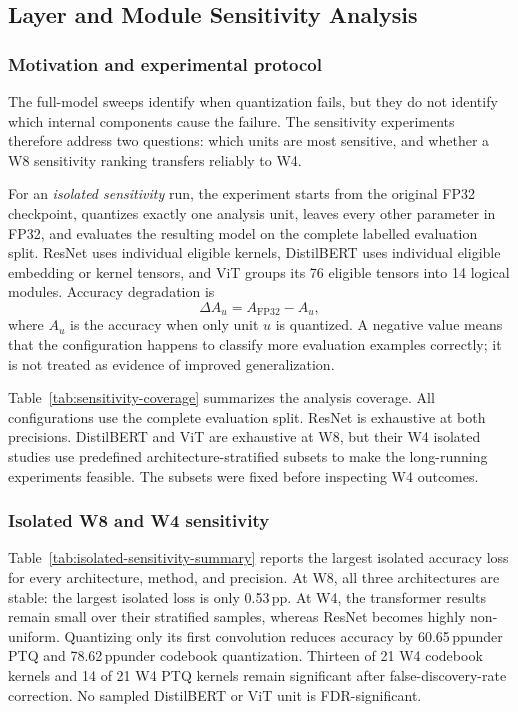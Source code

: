 \documentclass[conference]{IEEEtran}
\newcommand{\pp}{\,pp}
\begin{document}
\subsection{Layer and Module Sensitivity Analysis}
\label{sec:sensitivity}

\subsubsection{Motivation and experimental protocol}

The full-model sweeps identify when quantization fails, but they do not identify which internal components cause the failure. The sensitivity experiments therefore address two questions: which units are most sensitive, and whether a W8 sensitivity ranking transfers reliably to W4.

For an \emph{isolated sensitivity} run, the experiment starts from the original FP32 checkpoint, quantizes exactly one analysis unit, leaves every other parameter in FP32, and evaluates the resulting model on the complete labelled evaluation split. ResNet uses individual eligible kernels, DistilBERT uses individual eligible embedding or kernel tensors, and ViT groups its 76 eligible tensors into 14 logical modules. Accuracy degradation is
\begin{equation}
\Delta A_u=A_{\mathrm{FP32}}-A_u,
\end{equation}
where $A_u$ is the accuracy when only unit $u$ is quantized. A negative value means that the configuration happens to classify more evaluation examples correctly; it is not treated as evidence of improved generalization.

Table~\ref{tab:sensitivity-coverage} summarizes the analysis coverage. All configurations use the complete evaluation split. ResNet is exhaustive at both precisions. DistilBERT and ViT are exhaustive at W8, but their W4 isolated studies use predefined architecture-stratified subsets to make the long-running experiments feasible. The subsets were fixed before inspecting W4 outcomes.

\subsubsection{Isolated W8 and W4 sensitivity}

Table~\ref{tab:isolated-sensitivity-summary} reports the largest isolated accuracy loss for every architecture, method, and precision. At W8, all three architectures are stable: the largest isolated loss is only 0.53\pp. At W4, the transformer results remain small over their stratified samples, whereas ResNet becomes highly non-uniform. Quantizing only its first convolution reduces accuracy by 60.65\pp under PTQ and 78.62\pp under codebook quantization. Thirteen of 21 W4 codebook kernels and 14 of 21 W4 PTQ kernels remain significant after false-discovery-rate correction. No sampled DistilBERT or ViT unit is FDR-significant.
\end{document}
